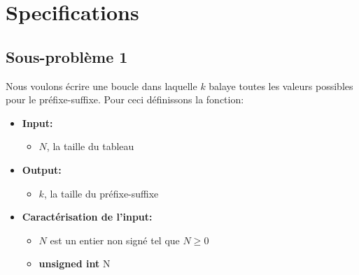 \section{Specifications}\label{specifications}


\subsection{Sous-problème 1}
Nous voulons écrire une boucle dans laquelle $k$ balaye toutes les valeurs
possibles pour le préfixe-suffixe. Pour ceci définissons la fonction:
\begin{itemize}
   \item \textbf{Input:}
      \begin{itemize}
         \item $N$, la taille du tableau
      \end{itemize}
   \item \textbf{Output:}
      \begin{itemize}
         \item $k$, la taille du préfixe-suffixe
      \end{itemize}
   \item \textbf{Caractérisation de l'input:}
      \begin{itemize}
         \item $N$ est un entier non signé tel que $N \geq 0$
         \item \textbf{unsigned int} N
      \end{itemize}
\end{itemize}

